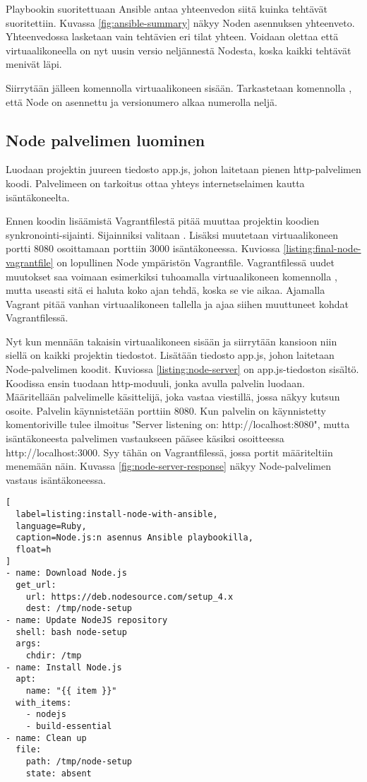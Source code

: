 Playbookin suoritettuaan Ansible antaa yhteenvedon siitä kuinka tehtävät suoritettiin. Kuvassa \ref{fig:ansible-summary} näkyy Noden asennuksen yhteenveto. Yhteenvedossa lasketaan vain tehtävien eri tilat yhteen. Voidaan olettaa että virtuaalikoneella on nyt uusin versio neljännestä Nodesta, koska kaikki tehtävät menivät läpi.

Siirrytään jälleen komennolla  virtuaalikoneen sisään. Tarkastetaan komennolla , että Node on asennettu ja versionumero alkaa numerolla neljä.

\subsection{Node palvelimen luominen}

Luodaan projektin juureen tiedosto app.js, johon laitetaan pienen http-palvelimen koodi. Palvelimeen on tarkoitus ottaa yhteys internetselaimen kautta isäntäkoneelta.

Ennen koodin lisäämistä Vagrantfilestä pitää muuttaa projektin koodien synkronointi-sijainti. Sijainniksi valitaan . Lisäksi muutetaan virtuaalikoneen portti 8080 osoittamaan porttiin 3000 isäntäkoneessa. Kuviossa \ref{listing:final-node-vagrantfile} on lopullinen Node ympäristön Vagrantfile. Vagrantfilessä uudet muutokset saa voimaan esimerkiksi tuhoamalla virtuaalikoneen komennolla , mutta useasti sitä ei haluta koko ajan tehdä, koska se vie aikaa. Ajamalla  Vagrant pitää vanhan virtuaalikoneen tallella ja ajaa siihen muuttuneet kohdat Vagrantfilessä.

Nyt kun mennään takaisin virtuaalikoneen sisään ja siirrytään kansioon  niin siellä on kaikki projektin tiedostot. Lisätään tiedosto app.js, johon laitetaan Node-palvelimen koodit. Kuviossa \ref{listing:node-server} on app.js-tiedoston sisältö. Koodissa ensin tuodaan http-moduuli, jonka avulla palvelin luodaan. Määritellään palvelimelle käsittelijä, joka vastaa viestillä, jossa näkyy kutsun osoite. Palvelin käynnistetään porttiin 8080. Kun palvelin on käynnistetty komentoriville tulee ilmoitus "Server listening on: http://localhost:8080", mutta isäntäkoneesta palvelimen vastaukseen pääsee käsiksi osoitteessa http://localhost:3000. Syy tähän on Vagrantfilessä, jossa portit määriteltiin menemään näin. Kuvassa \ref{fig:node-server-response} näkyy Node-palvelimen vastaus isäntäkoneessa.

\begin{lstlisting}[
  label=listing:install-node-with-ansible,
  language=Ruby,
  caption=Node.js:n asennus Ansible playbookilla,
  float=h
]
- name: Download Node.js
  get_url:
    url: https://deb.nodesource.com/setup_4.x
    dest: /tmp/node-setup
- name: Update NodeJS repository
  shell: bash node-setup
  args:
    chdir: /tmp
- name: Install Node.js
  apt:
    name: "{{ item }}"
  with_items:
    - nodejs
    - build-essential
- name: Clean up
  file:
    path: /tmp/node-setup
    state: absent
\end{lstlisting}

